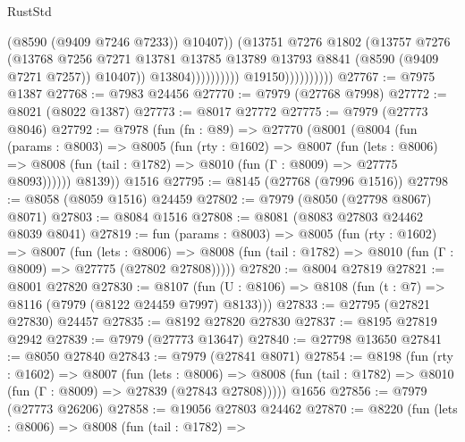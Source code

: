 \begin{lexlean}{RustStd}
\begin{coremodule}
                                              (@8590 (@9409 @7246 @7233))
                                              @10407))
                                          (@13751
                                            @7276
                                            @1802
                                            (@13757
                                              @7276
                                              (@13768
                                                @7256
                                                @7271
                                                @13781
                                                @13785
                                                @13789
                                                @13793
                                                @8841
                                                (@8590 (@9409 @7271 @7257))
                                                @10407))
                                            @13804))))))))))
                        @19150))))))))))
@27767 := @7975 @1387
@27768 := @7983 @24456
@27770 := @7979 (@27768 @7998)
@27772 := @8021 (@8022 @1387)
@27773 := @8017 @27772
@27775 := @7979 (@27773 @8046)
@27792 := @7978
    (fun (fn : @89) =>
    @27770
      (@8001
        (@8004
          (fun (params : @8003) =>
          @8005
            (fun (rty : @1602) =>
            @8007
              (fun (lets : @8006) =>
              @8008 (fun (tail : @1782) => @8010 (fun (Γ : @8009) => @27775 @8093))))))
        @8139))
    @1516
@27795 := @8145 (@27768 (@7996 @1516))
@27798 := @8058 (@8059 @1516) @24459
@27802 := @7979 (@8050 (@27798 @8067) @8071)
@27803 := @8084 @1516
@27808 := @8081 (@8083 @27803 @24462 @8039 @8041)
@27819 := fun (params : @8003) =>
  @8005
    (fun (rty : @1602) =>
    @8007
      (fun (lets : @8006) =>
      @8008 (fun (tail : @1782) => @8010 (fun (Γ : @8009) => @27775 (@27802 @27808)))))
@27820 := @8004 @27819
@27821 := @8001 @27820
@27830 := @8107
    (fun (U : @8106) => @8108 (fun (t : @7) => @8116 (@7979 (@8122 @24459 @7997) @8133)))
@27833 := @27795 (@27821 @27830) @24457
@27835 := @8192 @27820 @27830
@27837 := @8195 @27819 @2942
@27839 := @7979 (@27773 @13647)
@27840 := @27798 @13650
@27841 := @8050 @27840
@27843 := @7979 (@27841 @8071)
@27854 := @8198
    (fun (rty : @1602) =>
    @8007
      (fun (lets : @8006) =>
      @8008 (fun (tail : @1782) => @8010 (fun (Γ : @8009) => @27839 (@27843 @27808)))))
    @1656
@27856 := @7979 (@27773 @26206)
@27858 := @19056 @27803 @24462
@27870 := @8220
    (fun (lets : @8006) =>
    @8008
      (fun (tail : @1782) =>

\end{coremodule}
\end{lexlean}
